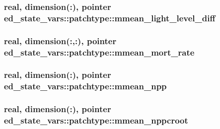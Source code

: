 \subsubsection[{\texorpdfstring{mmean\+\_\+light\+\_\+level\+\_\+diff}{mmean_light_level_diff}}]{\setlength{\rightskip}{0pt plus 5cm}real, dimension(\+:), pointer ed\+\_\+state\+\_\+vars\+::patchtype\+::mmean\+\_\+light\+\_\+level\+\_\+diff}\hypertarget{structed__state__vars_1_1patchtype_ab5c7da787c7968179fd8a704183bb00b}{}\label{structed__state__vars_1_1patchtype_ab5c7da787c7968179fd8a704183bb00b}
\subsubsection[{\texorpdfstring{mmean\+\_\+mort\+\_\+rate}{mmean_mort_rate}}]{\setlength{\rightskip}{0pt plus 5cm}real, dimension(\+:,\+:), pointer ed\+\_\+state\+\_\+vars\+::patchtype\+::mmean\+\_\+mort\+\_\+rate}\hypertarget{structed__state__vars_1_1patchtype_ad6f9088d117e132607def307f6298de7}{}\label{structed__state__vars_1_1patchtype_ad6f9088d117e132607def307f6298de7}
\subsubsection[{\texorpdfstring{mmean\+\_\+npp}{mmean_npp}}]{\setlength{\rightskip}{0pt plus 5cm}real, dimension(\+:), pointer ed\+\_\+state\+\_\+vars\+::patchtype\+::mmean\+\_\+npp}\hypertarget{structed__state__vars_1_1patchtype_a2375cee1381f9878ac9d98e187b61cde}{}\label{structed__state__vars_1_1patchtype_a2375cee1381f9878ac9d98e187b61cde}
\subsubsection[{\texorpdfstring{mmean\+\_\+nppcroot}{mmean_nppcroot}}]{\setlength{\rightskip}{0pt plus 5cm}real, dimension(\+:), pointer ed\+\_\+state\+\_\+vars\+::patchtype\+::mmean\+\_\+nppcroot}\hypertarget{structed__state__vars_1_1patchtype_a208f1891b3070ce8d4d5201d7a1ba175}{}\label{structed__state__vars_1_1patchtype_a208f1891b3070ce8d4d5201d7a1ba175}
